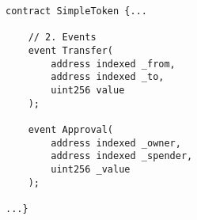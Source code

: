 \begin{lstlisting}[language=Solidity]
contract SimpleToken {...

    // 2. Events
    event Transfer(
        address indexed _from,
        address indexed _to,
        uint256 value
    );

    event Approval(
        address indexed _owner,
        address indexed _spender,
        uint256 _value
    );
    
...}
\end{lstlisting}